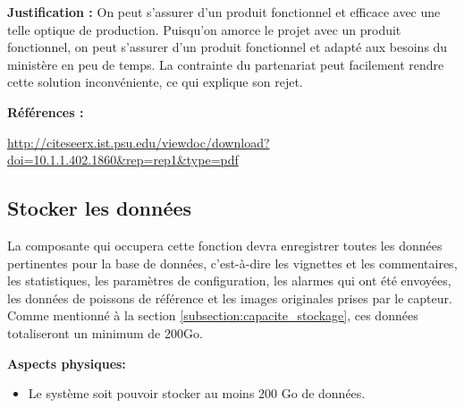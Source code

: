 \textbf{Justification :} On peut s’assurer d’un produit fonctionnel et efficace avec une telle optique de production. Puisqu’on amorce le projet avec un produit fonctionnel, on peut s’assurer d’un produit fonctionnel et adapté aux besoins du ministère en peu de temps. La contrainte du partenariat peut facilement rendre cette solution inconvéniente, ce qui explique son rejet.


\textbf{Références :}

\url{http://citeseerx.ist.psu.edu/viewdoc/download?doi=10.1.1.402.1860&rep=rep1&type=pdf}


\begin{table}[!htb]
\footnotesize
\centering
{}
\end{table}


\subsection{Stocker les données}
La composante qui occupera cette fonction devra enregistrer toutes les données pertinentes pour la base de données, c'est-à-dire les vignettes et les commentaires, les statistiques, les paramètres de configuration, les alarmes  qui ont été envoyées, les données de poissons de référence et les images originales prises par le capteur.
Comme mentionné à la section \ref{subsection:capacite_stockage}, ces données totaliseront un minimum de 200Go.

\textbf{Aspects physiques:}
\begin{itemize} [label = {--}]
    \item Le système soit pouvoir stocker au moins 200 Go de données.
\end{itemize}

